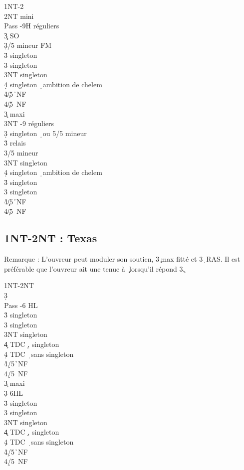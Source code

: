 \documentclass[a4paper]{article}
\begin{document}
\begin{bidtable}
1NT-2\s\\
2NT \> mini\+\\
Pass -9H réguliers\\
3\c \> SO\\
3\d {}/5 mineur FM\\
3\h \> singleton \s \\
3\s \> singleton \h \\
3NT \> singleton \d \\
4\d \> singleton \d\ ambition de chelem\\
4\h {}\c /5\h\ NF\\
4\s {}\c /5\s\ NF\-\\
3\c \> maxi\+\\
3NT -9 réguliers\\
3\d \> singleton \d\ ou 5/5 mineur\+\\
3\h \> relais\+\\
3\s {}/5 mineur\\
3NT \> singleton \d \\
4\d \> singleton \d\ ambition de chelem\-\-\\
3\h \> singleton \s \\
3\s \> singleton \h \\
4\h {}\c /5\h\ NF\\
4\s {}\c /5\s\ NF\-
\end{bidtable}

\subsection{1NT-2NT : Texas \pdfd}

Remarque : L'ouvreur peut moduler son soutien, 3\c\ max fitté et 3\d\ RAS.
Il est préférable que l'ouvreur ait une tenue à \c\ lorsqu'il répond 3\c .

\begin{bidtable}
1NT-2NT\\
3\d\+\\
Pass -6 HL\\
3\h \> singleton \s \\
3\s \> singleton \h \\
3NT \> singleton \c \\
4\c \> TDC \d , singleton \c \\
4\d \> TDC \d\ sans singleton\\
4\h {}\d /5\h\ NF\\
4\s {}\d /5\s\ NF\-\\
3\c \> maxi\+\\
3\d {}-6HL\\
3\h \> singleton \s \\
3\s \> singleton \h \\
3NT \> singleton \c \\
4\c \> TDC \d , singleton \c \\
4\d \> TDC \d\ sans singleton\\
4\h {}\d /5\h\ NF\\
4\s {}\d /5\s\ NF\-
\end{bidtable}
\end{document}
